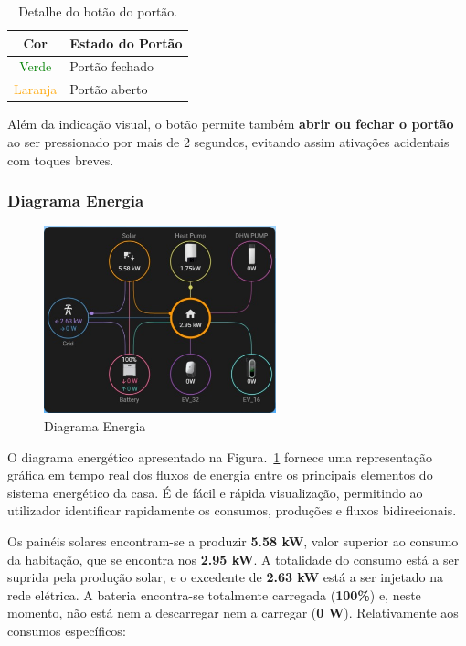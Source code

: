 \begin{table}[H]
\centering
\begin{tabular}{|c|l|}
\hline
\textbf{Cor} & \textbf{Estado do Portão} \\
\hline
\textcolor{green}{Verde} & Portão fechado \\
\textcolor{orange}{Laranja} & Portão aberto \\
\hline
\end{tabular}
\caption{Detalhe do botão do portão.}
\label{tab:estado_portao}
\end{table}


Além da indicação visual, o botão permite também \textbf{abrir ou fechar o portão} ao ser pressionado por mais de 2 segundos, evitando assim ativações acidentais com toques breves.

\subsubsection{Diagrama Energia}

\begin{figure}[H]
    \centering
    \includegraphics[width=0.6\textwidth]{images/diagrama_energia.png}
    \caption{Diagrama Energia}
    \label{fig:diagrama_energia.png}
\end{figure}

O diagrama energético apresentado na Figura.~\ref{fig:diagrama_energia.png} fornece uma representação gráfica em tempo real dos fluxos de energia entre os principais elementos do sistema energético da casa. É de fácil e rápida visualização, permitindo ao utilizador identificar rapidamente os consumos, produções e fluxos bidirecionais.

Os painéis solares encontram-se a produzir \textbf{5.58 kW}, valor superior ao consumo da habitação, que se encontra nos \textbf{2.95 kW}. A totalidade do consumo está a ser suprida pela produção solar, e o excedente de \textbf{2.63 kW} está a ser injetado na rede elétrica. A bateria encontra-se totalmente carregada (\textbf{100\%}) e, neste momento, não está nem a descarregar nem a carregar (\textbf{0 W}). Relativamente aos consumos específicos:

